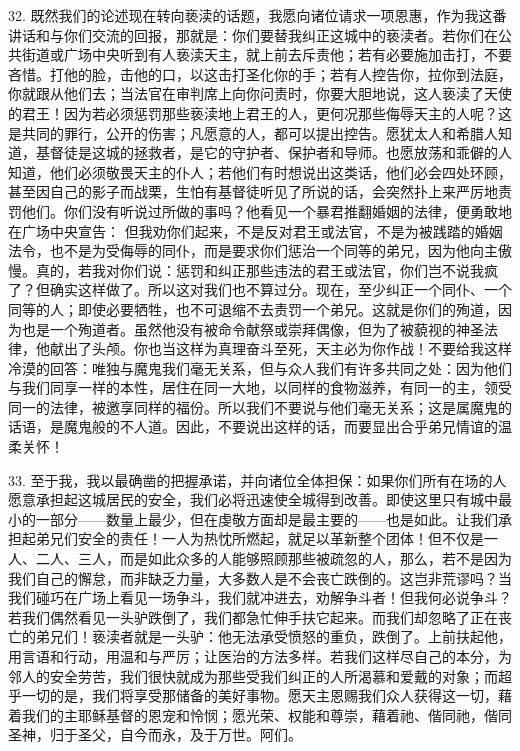 32. 既然我们的论述现在转向亵渎的话题，我愿向诸位请求一项恩惠，作为我这番讲话和与你们交流的回报，那就是：你们要替我纠正这城中的亵渎者。若你们在公共街道或广场中央听到有人亵渎天主，就上前去斥责他；若有必要施加击打，不要吝惜。打他的脸，击他的口，以这击打圣化你的手；若有人控告你，拉你到法庭，你就跟从他们去；当法官在审判席上向你问责时，你要大胆地说，这人亵渎了天使的君王！因为若必须惩罚那些亵渎地上君王的人，更何况那些侮辱天主的人呢？这是共同的罪行，公开的伤害；凡愿意的人，都可以提出控告。愿犹太人和希腊人知道，基督徒是这城的拯救者，是它的守护者、保护者和导师。也愿放荡和乖僻的人知道，他们必须敬畏天主的仆人；若他们有时想说出这类话，他们必会四处环顾，甚至因自己的影子而战栗，生怕有基督徒听见了所说的话，会突然扑上来严厉地责罚他们。你们没有听说过所做的事吗？他看见一个暴君推翻婚姻的法律，便勇敢地在广场中央宣告： 但我劝你们起来，不是反对君王或法官，不是为被践踏的婚姻法令，也不是为受侮辱的同仆，而是要求你们惩治一个同等的弟兄，因为他向主傲慢。真的，若我对你们说：惩罚和纠正那些违法的君王或法官，你们岂不说我疯了？但确实这样做了。所以这对我们也不算过分。现在，至少纠正一个同仆、一个同等的人；即使必要牺牲，也不可退缩不去责罚一个弟兄。这就是你们的殉道，因为也是一个殉道者。虽然他没有被命令献祭或崇拜偶像，但为了被藐视的神圣法律，他献出了头颅。你也当这样为真理奋斗至死，天主必为你作战！不要给我这样冷漠的回答：唯独与魔鬼我们毫无关系，但与众人我们有许多共同之处：因为他们与我们同享一样的本性，居住在同一大地，以同样的食物滋养，有同一的主，领受同一的法律，被邀享同样的福份。所以我们不要说与他们毫无关系；这是属魔鬼的话语，是魔鬼般的不人道。因此，不要说出这样的话，而要显出合乎弟兄情谊的温柔关怀！\par

33. 至于我，我以最确凿的把握承诺，并向诸位全体担保：如果你们所有在场的人愿意承担起这城居民的安全，我们必将迅速使全城得到改善。即使这里只有城中最小的一部分——数量上最少，但在虔敬方面却是最主要的——也是如此。让我们承担起弟兄们安全的责任！一人为热忱所燃起，就足以革新整个团体！但不仅是一人、二人、三人，而是如此众多的人能够照顾那些被疏忽的人，那么，若不是因为我们自己的懈怠，而非缺乏力量，大多数人是不会丧亡跌倒的。这岂非荒谬吗？当我们碰巧在广场上看见一场争斗，我们就冲进去，劝解争斗者！但我何必说争斗？若我们偶然看见一头驴跌倒了，我们都急忙伸手扶它起来。而我们却忽略了正在丧亡的弟兄们！亵渎者就是一头驴：他无法承受愤怒的重负，跌倒了。上前扶起他，用言语和行动，用温和与严厉；让医治的方法多样。若我们这样尽自己的本分，为邻人的安全劳苦，我们很快就成为那些受我们纠正的人所渴慕和爱戴的对象；而超乎一切的是，我们将享受那储备的美好事物。愿天主恩赐我们众人获得这一切，藉着我们的主耶稣基督的恩宠和怜悯；愿光荣、权能和尊崇，藉着祂、偕同祂，偕同圣神，归于圣父，自今而永，及于万世。阿们。\par

